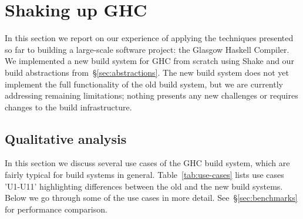 \section{Shaking up GHC\label{sec:ghc}}

In this section we report on our experience of applying the techniques presented
so far to building a large-scale software project: the Glasgow Haskell Compiler.
We implemented a new build system for GHC from scratch using Shake and our build
abstractions from~\S\ref{sec:abstractions}. The new build system does not yet
implement the full functionality of the old build system, but we are
currently addressing remaining limitations; nothing presents any
new challenges or requires changes to the build infrastructure.

% 
%

\subsection{Qualitative analysis\label{sec:use-cases}}

In this section we discuss several use cases of the GHC build system, which
are fairly typical for build systems in general. Table~\ref{tab:use-cases}
lists use cases \lst'U1-U11' highlighting differences between the old and the
new build systems. Below we go through some of the use cases in more detail.
See~\S\ref{sec:benchmarks} for performance comparison.

